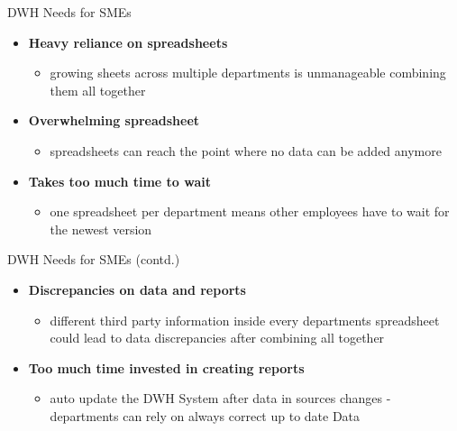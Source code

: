 \documentclass[aspectratio=169]{beamer}
\begin{document}
  \begin{frame}{DWH Needs for SMEs}

    \begin{itemize}
      \item \textbf{Heavy reliance on spreadsheets}
      	\begin{itemize}
      	   \item growing sheets across multiple departments is unmanageable combining them all together
      	\end{itemize}
      \item \textbf{Overwhelming spreadsheet}
		\begin{itemize}
		   \item spreadsheets can reach the point where no data can be added anymore
      	\end{itemize}
      \item \textbf{Takes too much time to wait}
      	\begin{itemize}
      	   \item one spreadsheet per department means other employees have to wait for the newest version
      	\end{itemize}
    \end{itemize}
  \end{frame}

  \begin{frame}{DWH Needs for SMEs (contd.)}
    \begin{itemize}
      \item \textbf{Discrepancies on data and reports}
      	\begin{itemize}
      	   \item different third party information inside every departments spreadsheet could lead to data discrepancies after combining all together
      	\end{itemize}
      \item \textbf{Too much time invested in creating reports}
        \begin{itemize}
      	   \item auto update the DWH System after data in sources changes - departments can rely on always correct up to date Data
      	\end{itemize}
    \end{itemize}
  \end{frame}
\end{document}
